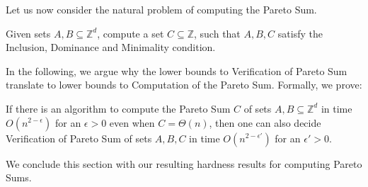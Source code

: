Let us now consider the natural problem of computing the Pareto Sum.
\begin{definition}
	Given sets $A,B \subseteq \mathbb{Z}^d$, compute a set $C \subseteq \mathbb{Z}$,
	such that $A,B,C$ satisfy the Inclusion, Dominance and Minimality condition.
\end{definition}


In the following, we argue why the lower bounds to Verification of Pareto Sum translate to lower bounds 
to Computation of the Pareto Sum. Formally, we prove: 



\begin{lemma}
If there is an algorithm to compute the Pareto Sum $C$ of sets $A,B \subseteq \mathbb{Z}^d$ in time 
	$O(n^{2-\epsilon})$ for an $\epsilon>0$ even when $C=\Theta(n)$,
then one can also decide Verification of Pareto Sum of sets $A,B,C$ in time $O(n^{2-\epsilon'})$ for an
$\epsilon'>0$. 
\label{Verif to Comp}
\end{lemma}

We conclude this section with our resulting hardness results for computing Pareto Sums.
\lowerboundPS*



